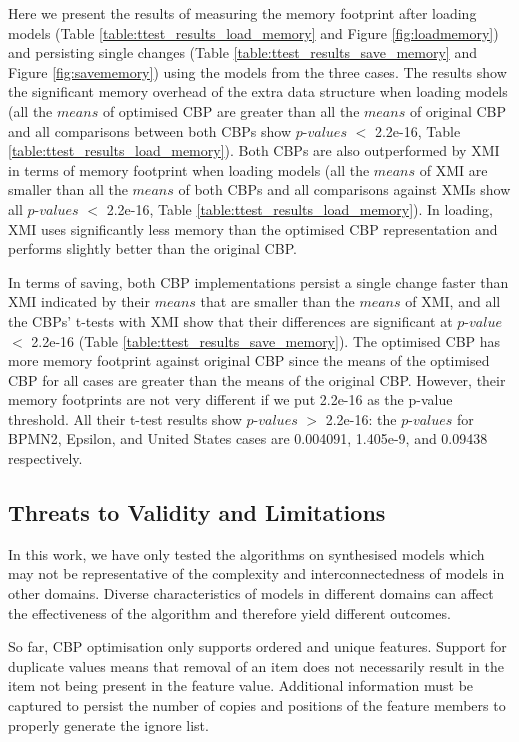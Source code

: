\documentclass{llncs}
\begin{document}
{    Here we present the results of measuring the memory footprint after loading models (Table \ref{table:ttest_results_load_memory} and Figure \ref{fig:loadmemory}) and persisting single changes (Table \ref{table:ttest_results_save_memory} and Figure \ref{fig:savememory}) using the models from the three cases. The results show the significant memory overhead of the extra data structure when loading models (all the $means$ of optimised CBP are greater than all the $means$ of original CBP and all comparisons between both CBPs show $p$-$values$ $<$ 2.2e-16, Table \ref{table:ttest_results_load_memory}). Both CBPs are also outperformed by XMI in terms of memory footprint when loading models (all the $means$ of XMI are smaller than all the $means$ of both CBPs and all comparisons against XMIs show all $p$-$values$ $<$ 2.2e-16, Table \ref{table:ttest_results_load_memory}). In loading, XMI uses significantly less memory than the optimised CBP representation and performs slightly better than the original CBP.   
    
    \vspace{-10pt}
    In terms of saving, both CBP implementations persist a single change faster than XMI indicated by their $means$ that are smaller than the $means$ of XMI, and all the CBPs' t-tests with XMI show that their differences are significant at $p$-$value$ $<$ 2.2e-16 (Table \ref{table:ttest_results_save_memory}). The optimised CBP has more memory footprint against original CBP since the means of the optimised CBP for all cases are greater than the means of the original CBP. However, their memory footprints are not very different if we put 2.2e-16 as the p-value threshold. All their t-test results show $p$-$values$ $>$ 2.2e-16: the $p$-$values$ for BPMN2, Epsilon, and United States cases are 0.004091, 1.405e-9, and 0.09438 respectively.   
   
    \subsection{Threats to Validity and Limitations}
    \label{sec:limitations_and_future_work}
    In this work, we have only tested the algorithms on synthesised  models which may not be representative of the complexity and interconnectedness of models in other domains. Diverse characteristics of models in different domains can affect the effectiveness of the algorithm and therefore yield different outcomes. 
    
    So far, CBP optimisation only supports ordered and unique features. Support for duplicate values means that removal of an item does not necessarily result in the item not being present in the feature value. Additional information must be captured to persist the number of copies and positions of the feature members to properly generate the ignore list. 
    
}
\end{document}
